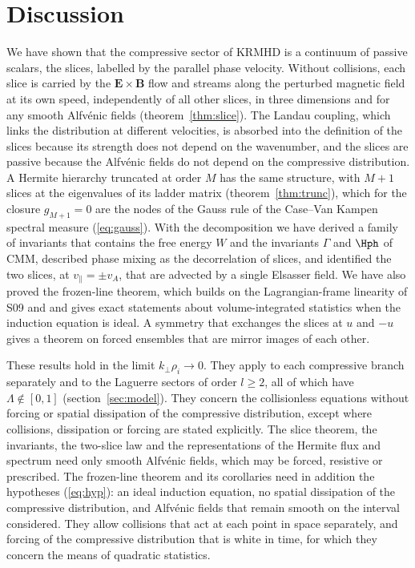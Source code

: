 \section{Discussion}\label{sec:discussion}

We have shown that the compressive sector of KRMHD is a continuum of passive scalars, the slices, labelled by the parallel phase velocity. Without collisions, each slice is carried by the $\boldsymbol E\times\boldsymbol B$ flow and streams along the perturbed magnetic field at its own speed, independently of all other slices, in three dimensions and for any smooth Alfv\'enic fields (theorem~\ref{thm:slice}). The Landau coupling, which links the distribution at different velocities, is absorbed into the definition of the slices because its strength does not depend on the wavenumber, and the slices are passive because the Alfv\'enic fields do not depend on the compressive distribution. A Hermite hierarchy truncated at order $M$ has the same structure, with $M+1$ slices at the eigenvalues of its ladder matrix (theorem~\ref{thm:trunc}), which for the closure $g_{M+1}=0$ are the nodes of the Gauss rule of the Case--Van Kampen spectral measure (\ref{eq:gauss}). With the decomposition we have derived a family of invariants that contains the free energy $W$ and the invariants $\Gamma$ and $\Hph$ of CMM, described phase mixing as the decorrelation of slices, and identified the two slices, at $v_\parallel=\pm v_A$, that are advected by a single Elsasser field. We have also proved the frozen-line theorem, which builds on the Lagrangian-frame linearity of S09 and \citet{Kunz2015} and gives exact statements about volume-integrated statistics when the induction equation is ideal. A symmetry that exchanges the slices at $u$ and $-u$ gives a theorem on forced ensembles that are mirror images of each other.

These results hold in the limit $k_\perp\rho_i\to0$. They apply to each compressive branch separately and to the Laguerre sectors of order $l\ge2$, all of which have $\Lambda\notin[0,1]$ (section~\ref{sec:model}). They concern the collisionless equations without forcing or spatial dissipation of the compressive distribution, except where collisions, dissipation or forcing are stated explicitly. The slice theorem, the invariants, the two-slice law and the representations of the Hermite flux and spectrum need only smooth Alfv\'enic fields, which may be forced, resistive or prescribed. The frozen-line theorem and its corollaries need in addition the hypotheses (\ref{eq:hyp}): an ideal induction equation, no spatial dissipation of the compressive distribution, and Alfv\'enic fields that remain smooth on the interval considered. They allow collisions that act at each point in space separately, and forcing of the compressive distribution that is white in time, for which they concern the means of quadratic statistics.


